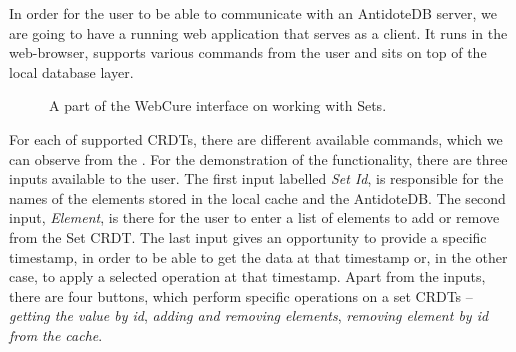 In order for the user to be able to communicate with an AntidoteDB server, we are going to have a running web application that serves as a client. It runs in the web-browser, supports various commands from the user and sits on top of the local database layer.

\begin{figure}[!htb]
    \begin{center}
    \setlength{\fboxsep}{4pt}%
    \setlength{\fboxrule}{1pt}%
    {\scriptsize}
    \caption {A part of the WebCure interface on working with Sets.}
    \label{fig:dev2}
\end{center}
\end{figure}
 

For each of supported CRDTs, there are different available commands, which we can observe from the . For the demonstration of the functionality, there are three inputs available to the user. The first input labelled \textit{Set Id}, is responsible for the names of the elements stored in the local cache and the AntidoteDB. The second input, \textit{Element}, is there for the user to enter a list of elements to add or remove from the Set CRDT. The last input gives an opportunity to provide a specific timestamp, in order to be able to get the data at that timestamp or, in the other case, to apply a selected operation at that timestamp. Apart from the inputs, there are four buttons, which perform specific operations on a set CRDTs -- \textit{getting the value by id}, \textit{adding and removing elements}, \textit{removing element by id from the cache}.

